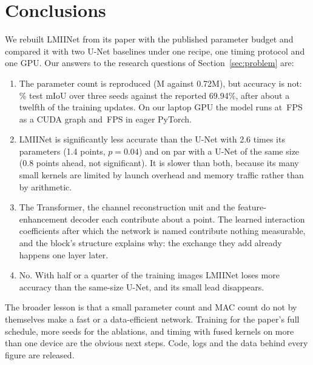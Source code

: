 \documentclass{article}
\begin{document}
\section{Conclusions}
\label{sec:conclusion}
We rebuilt LMIINet from its paper with the published parameter budget and compared it with two
U-Net baselines under one recipe, one timing protocol and one GPU. Our answers to the research
questions of Section~\ref{sec:problem} are:
\begin{enumerate}
  \item[RQ1] The parameter count is reproduced (\LmiiParams{}M against 0.72M), but accuracy is not:
             \LmiiMiou\% test mIoU over three seeds against the reported 69.94\%, after about a
             twelfth of the training updates. On our laptop GPU the model runs at \LmiiFpsG{}\,FPS
             as a CUDA graph and \LmiiFps{}\,FPS in eager PyTorch.
  \item[RQ2] LMIINet is significantly less accurate than the U-Net with 2.6 times its parameters
             (1.4 points, $p = 0.04$) and on par with a U-Net of the same size (0.8 points ahead,
             not significant). It is slower than both, because its many small kernels are limited
             by launch overhead and memory traffic rather than by arithmetic.
  \item[RQ3] The Transformer, the channel reconstruction unit and the feature-enhancement decoder
             each contribute about a point. The learned interaction coefficients after which the
             network is named contribute nothing measurable, and the block's structure explains
             why: the exchange they add already happens one layer later.
  \item[RQ4] No. With half or a quarter of the training images LMIINet loses more accuracy than
             the same-size U-Net, and its small lead disappears.
\end{enumerate}
The broader lesson is that a small parameter count and MAC count do not by themselves make a fast
or a data-efficient network. Training for the paper's full schedule, more seeds for the ablations,
and timing with fused kernels on more than one device are the obvious next steps. Code, logs and
the data behind every figure are released.
\end{document}
